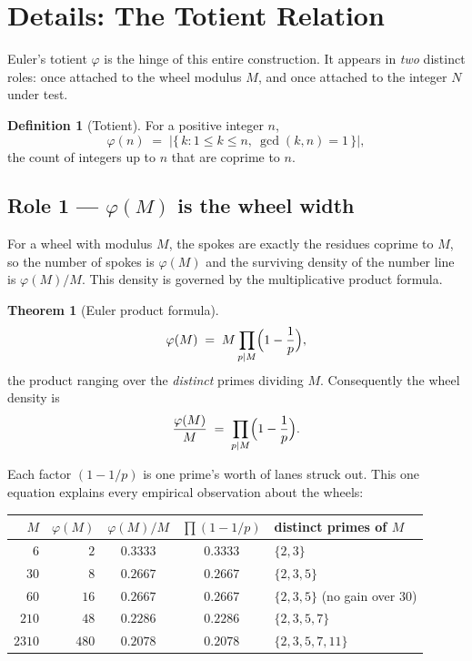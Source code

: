\documentclass[11pt]{article}
\theoremstyle{definition}
\newtheorem{definition}{Definition}
\newtheorem{theorem}{Theorem}
\begin{document}
\section*{\textbf{Details: The Totient Relation}}

Euler's totient $\varphi$ is the hinge of this entire construction. It
appears in \emph{two} distinct roles: once attached to the wheel modulus
$M$, and once attached to the integer $N$ under test.

\begin{definition}[Totient]
For a positive integer $n$,
\[
\varphi(n) \;=\; \bigl|\{\, k : 1 \le k \le n,\ \gcd(k,n)=1 \,\}\bigr|,
\]
the count of integers up to $n$ that are coprime to $n$.
\end{definition}

\subsection*{Role 1 --- $\varphi(M)$ is the wheel width}

For a wheel with modulus $M$, the spokes are exactly the residues coprime
to $M$, so the number of spokes is $\varphi(M)$ and the surviving density
of the number line is $\varphi(M)/M$. This density is governed by the
multiplicative product formula.

\begin{theorem}[Euler product formula]
\[
\varphi(M) \;=\; M \prod_{p \mid M} \Bigl(1 - \frac{1}{p}\Bigr),
\]
the product ranging over the \emph{distinct} primes dividing $M$.
Consequently the wheel density is
\[
\frac{\varphi(M)}{M} \;=\; \prod_{p \mid M}\Bigl(1 - \frac1p\Bigr).
\]
\end{theorem}

Each factor $(1-1/p)$ is one prime's worth of lanes struck out. This one
equation explains every empirical observation about the wheels:

\begin{center}
\begin{tabular}{r r c c l}
\toprule
$M$ & $\varphi(M)$ & $\varphi(M)/M$ & $\prod(1-1/p)$ & distinct primes of $M$\\
\midrule
$6$    & $2$   & $0.3333$ & $0.3333$ & $\{2,3\}$\\
$30$   & $8$   & $0.2667$ & $0.2667$ & $\{2,3,5\}$\\
$60$   & $16$  & $0.2667$ & $0.2667$ & $\{2,3,5\}$ \quad(no gain over $30$)\\
$210$  & $48$  & $0.2286$ & $0.2286$ & $\{2,3,5,7\}$\\
$2310$ & $480$ & $0.2078$ & $0.2078$ & $\{2,3,5,7,11\}$\\
\bottomrule
\end{tabular}
\end{center}
\end{document}

